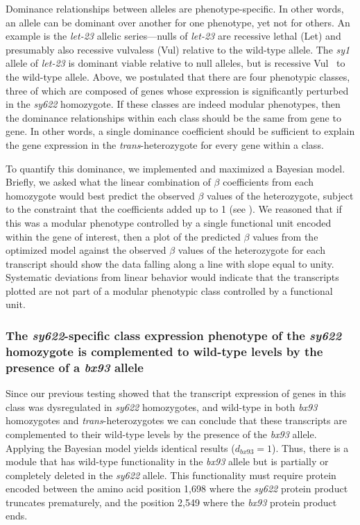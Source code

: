 \documentclass[10pt, twocolumn]{article}
\newcommand{\gene}[1]{\mbox{\emph{#1}}}
\begin{document}
Dominance relationships between alleles are phenotype-specific. In other
words, an allele can be dominant over another for one phenotype, yet not for
others. An example is the \gene{let-23} allelic series---nulls of
\gene{let-23} are recessive lethal (Let) and presumably also recessive vulvaless
(Vul) relative to the wild-type allele. The \emph{sy1} allele of
\gene{let-23} is dominant viable relative to null alleles, but is recessive
Vul~\cite{} to the wild-type allele. Above, we postulated that there are four
phenotypic classes, three of which are composed of genes whose expression is
significantly perturbed in the \emph{sy622} homozygote.
If these classes are indeed modular phenotypes, then the dominance relationships
within each class should be the same from gene to gene. In other words, a single
dominance coefficient should be sufficient to explain the gene expression in the
\emph{trans}-heterozygote for every gene within a class.

To quantify this dominance, we implemented and maximized a Bayesian model.
Briefly, we asked what the linear combination of $\beta$ coefficients from each
homozygote would best predict the observed $\beta$ values of the heterozygote,
subject to the constraint that the coefficients added up to 1 (see
). We reasoned that if this was a modular phenotype
controlled by a single functional unit encoded within the gene of interest, then
a plot of the predicted $\beta$ values from the optimized model against the
observed $\beta$ values of the heterozygote for each transcript should show the
data falling along a line with slope equal to unity. Systematic deviations from
linear behavior would indicate that the transcripts plotted are not part of a
modular phenotypic class controlled by a functional unit.

\subsubsection*{The \emph{sy622}-specific class expression phenotype of the
                \emph{sy622} homozygote is complemented to wild-type levels by
                the presence of a \emph{bx93} allele}
Since our previous testing showed that the transcript expression of genes in
this class was dysregulated in \emph{sy622} homozygotes, and wild-type in both
\emph{bx93} homozygotes and \emph{trans}-heterozygotes we can conclude that
these transcripts are complemented to their wild-type levels by the presence of
the \emph{bx93} allele. Applying the Bayesian model yields identical results
($d_{bx93} = 1$).
Thus, there is a module that has wild-type functionality in the \emph{bx93}
allele but is partially or completely deleted in the \emph{sy622} allele. This
functionality must require protein encoded between the amino acid position 1,698
where the \emph{sy622} protein product truncates prematurely, and the position
2,549 where the \emph{bx93} protein product ends.
\end{document}
